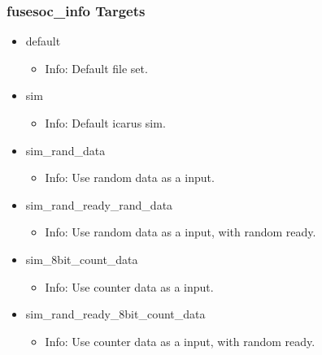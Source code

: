 \subsubsection{fusesoc\_info Targets}
\begin{itemize}
\item default
	\begin{itemize}
	\item[$\space$] Info: Default file set.
	\end{itemize}
\item sim
	\begin{itemize}
	\item[$\space$] Info: Default icarus sim.
	\end{itemize}
\item sim\_rand\_data
	\begin{itemize}
	\item[$\space$] Info: Use random data as a input.
	\end{itemize}
\item sim\_rand\_ready\_rand\_data
	\begin{itemize}
	\item[$\space$] Info: Use random data as a input, with random ready.
	\end{itemize}
\item sim\_8bit\_count\_data
	\begin{itemize}
	\item[$\space$] Info: Use counter data as a input.
	\end{itemize}
\item sim\_rand\_ready\_8bit\_count\_data
	\begin{itemize}
	\item[$\space$] Info: Use counter data as a input, with random ready.
	\end{itemize}
\end{itemize}
